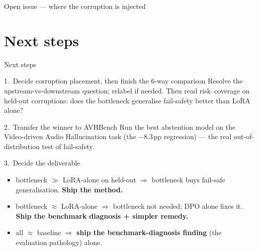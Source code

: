 \documentclass[10pt,aspectratio=169]{beamer}
\begin{document}
\begin{frame}{Open issue --- where the corruption is injected}
\begin{center}
\end{center}

\end{frame}

\section{Next steps}

\begin{frame}{Next steps}

\begin{block}{1.\ Decide corruption placement, then finish the 6-way comparison}
  Resolve the upstream-vs-downstream question; relabel if needed. Then read
  risk--coverage on held-out corruptions: does the bottleneck generalise
  fail-safety better than LoRA alone?
\end{block}

\begin{block}{2.\ Transfer the winner to AVHBench}
  Run the best abstention model on the Video-driven Audio Hallucination task
  (the $-8.3$\,pp regression) --- the real out-of-distribution test of fail-safety.
\end{block}

\begin{block}{3.\ Decide the deliverable}
  \begin{itemize}\setlength\itemsep{2pt}
    \item bottleneck $\gg$ LoRA-alone on held-out $\Rightarrow$ bottleneck buys fail-safe generalisation. \textbf{Ship the method.}
    \item bottleneck $\approx$ LoRA-alone $\Rightarrow$ bottleneck not needed; DPO alone fixes it. \textbf{Ship the benchmark diagnosis + simpler remedy.}
    \item all $\approx$ baseline $\Rightarrow$ \textbf{ship the benchmark-diagnosis finding} (the evaluation pathology) alone.
  \end{itemize}
\end{block}

\end{frame}
\end{document}
